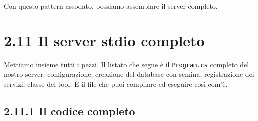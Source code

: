 \documentclass[
  italian,
  10pt,
]{book}
\begin{document}
Con questo pattern assodato, possiamo assemblare il server completo.

\section{2.11 Il server stdio completo}\label{il-server-stdio-completo}

Mettiamo insieme tutti i pezzi. Il listato che segue è il
\texttt{Program.cs} completo del nostro server: configurazione,
creazione del database con semina, registrazione dei servizi, classe del
tool. È il file che puoi compilare ed eseguire così com'è.

\subsection{2.11.1 Il codice completo}\label{il-codice-completo}
\end{document}
